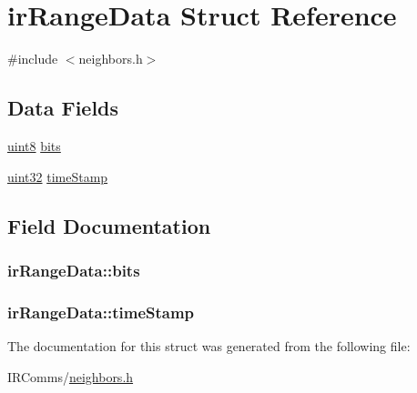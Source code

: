 \hypertarget{structir_range_data}{
\section{irRangeData Struct Reference}
\label{structir_range_data}
}


{\ttfamily \#include $<$neighbors.h$>$}

\subsection*{Data Fields}
\begin{DoxyCompactItemize}
\item 
\hyperlink{typedefs_8h_adde6aaee8457bee49c2a92621fe22b79}{uint8} \hyperlink{structir_range_data_a9fdc8dffce4f57dfacf7cee95b16a413}{bits}
\item 
\hyperlink{typedefs_8h_a4b435a49c74bb91f284f075e63416cb6}{uint32} \hyperlink{structir_range_data_a1a441a90591b416229a68453cbd7f441}{timeStamp}
\end{DoxyCompactItemize}


\subsection{Field Documentation}
\hypertarget{structir_range_data_a9fdc8dffce4f57dfacf7cee95b16a413}{
\subsubsection[{bits}]{ {\bf irRangeData::bits}}}
\label{structir_range_data_a9fdc8dffce4f57dfacf7cee95b16a413}
\hypertarget{structir_range_data_a1a441a90591b416229a68453cbd7f441}{
\subsubsection[{timeStamp}]{ {\bf irRangeData::timeStamp}}}
\label{structir_range_data_a1a441a90591b416229a68453cbd7f441}


The documentation for this struct was generated from the following file:\begin{DoxyCompactItemize}
\item 
IRComms/\hyperlink{neighbors_8h}{neighbors.h}\end{DoxyCompactItemize}
